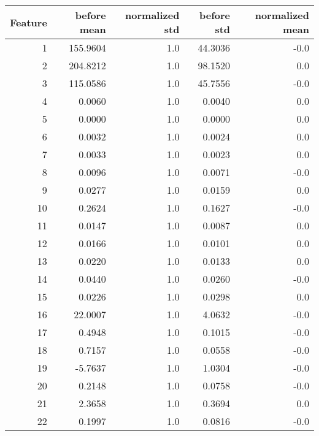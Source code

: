 \begin{tabular}{rrrrr}
\toprule
 Feature &  before mean &  normalized std &  before std &  normalized mean \\
\midrule
       1 &     155.9604 &             1.0 &     44.3036 &             -0.0 \\
       2 &     204.8212 &             1.0 &     98.1520 &              0.0 \\
       3 &     115.0586 &             1.0 &     45.7556 &             -0.0 \\
       4 &       0.0060 &             1.0 &      0.0040 &              0.0 \\
       5 &       0.0000 &             1.0 &      0.0000 &              0.0 \\
       6 &       0.0032 &             1.0 &      0.0024 &              0.0 \\
       7 &       0.0033 &             1.0 &      0.0023 &              0.0 \\
       8 &       0.0096 &             1.0 &      0.0071 &             -0.0 \\
       9 &       0.0277 &             1.0 &      0.0159 &              0.0 \\
      10 &       0.2624 &             1.0 &      0.1627 &             -0.0 \\
      11 &       0.0147 &             1.0 &      0.0087 &              0.0 \\
      12 &       0.0166 &             1.0 &      0.0101 &              0.0 \\
      13 &       0.0220 &             1.0 &      0.0133 &              0.0 \\
      14 &       0.0440 &             1.0 &      0.0260 &             -0.0 \\
      15 &       0.0226 &             1.0 &      0.0298 &              0.0 \\
      16 &      22.0007 &             1.0 &      4.0632 &             -0.0 \\
      17 &       0.4948 &             1.0 &      0.1015 &             -0.0 \\
      18 &       0.7157 &             1.0 &      0.0558 &             -0.0 \\
      19 &      -5.7637 &             1.0 &      1.0304 &             -0.0 \\
      20 &       0.2148 &             1.0 &      0.0758 &             -0.0 \\
      21 &       2.3658 &             1.0 &      0.3694 &              0.0 \\
      22 &       0.1997 &             1.0 &      0.0816 &             -0.0 \\
\bottomrule
\end{tabular}
